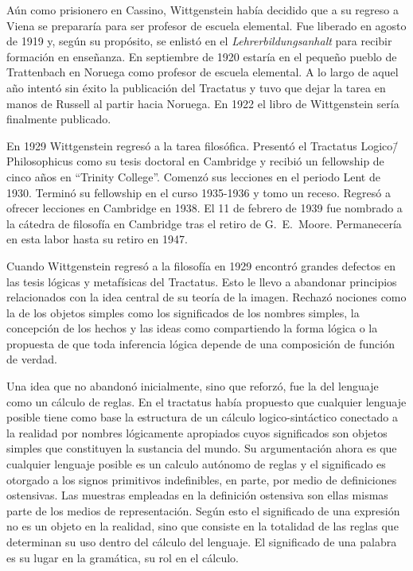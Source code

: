 
Aún como prisionero en Cassino, Wittgenstein había decidido que a su regreso a
Viena se prepararía para ser profesor de escuela
elemental\autocite[cf.~][p.~158]{monk1991duty}. Fue liberado en agosto de 1919
y, según su propósito, se enlistó en el \emph{Lehrerbildungsanhalt} para recibir
formación en enseñanza. En septiembre de 1920 estaría en el pequeño pueblo de
Trattenbach en Noruega como profesor de escuela elemental. A lo largo de aquel
año intentó sin éxito la publicación del Tractatus y tuvo que dejar la tarea en
manos de Russell al partir hacia Noruega. En 1922 el libro de Wittgenstein sería
finalmente publicado.

En 1929 Wittgenstein regresó a la tarea filosófica. Presentó el Tractatus
Logico\=/Philosophicus como su tesis doctoral en Cambridge y recibió un
fellowship de cinco años en ``Trinity College''. Comenzó sus lecciones en el
periodo Lent de 1930. Terminó su fellowship en el curso 1935-1936 y tomo un
receso. Regresó a ofrecer lecciones en Cambridge en 1938. El 11 de febrero de
1939 fue nombrado a la cátedra de filosofía en Cambridge tras el retiro de
G.~E.~Moore. Permanecería en esta labor hasta su retiro en 1947.

Cuando Wittgenstein regresó a la filosofía en 1929 encontró grandes defectos en
las tesis lógicas y metafísicas del Tractatus. Esto le llevo a abandonar
principios relacionados con la idea central de su teoría de la imagen. Rechazó
nociones como la de los objetos simples como los significados de los nombres
simples, la concepción de los hechos y las ideas como compartiendo la forma
lógica o la propuesta de que toda inferencia lógica depende de una composición
de función de verdad\autocite[cf.~][p.~44]{rulesngrammar}.

Una idea que no abandonó inicialmente, sino que reforzó, fue la del lenguaje
como un cálculo de reglas. En el tractatus había propuesto que cualquier
lenguaje posible tiene como base la estructura de un cálculo logico-sintáctico
conectado a la realidad por nombres lógicamente apropiados cuyos significados
son objetos simples que constituyen la sustancia del mundo. Su argumentación
ahora es que cualquier lenguaje posible es un calculo autónomo de reglas y el
significado es otorgado a los signos primitivos indefinibles, en parte, por
medio de definiciones ostensivas. Las muestras empleadas en la definición
ostensiva son ellas mismas parte de los medios de representación. Según esto el
significado de una expresión no es un objeto en la realidad, sino que consiste
en la totalidad de las reglas que determinan su uso dentro del cálculo del
lenguaje. El significado de una palabra es su lugar en la gramática, su rol en
el cálculo\autocite[cf.~][p.44]{rulesngrammar}.

